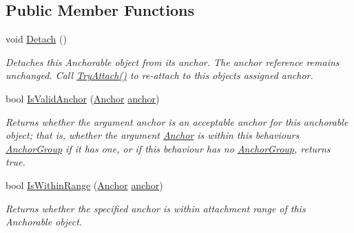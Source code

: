 \subsection*{Public Member Functions}
\begin{DoxyCompactItemize}
\item 
void \mbox{\hyperlink{class_leap_1_1_unity_1_1_interaction_1_1_anchorable_behaviour_afdba1fc31f7d6a20af66bdac91bf5d72}{Detach}} ()
\begin{DoxyCompactList}\small\item\em Detaches this Anchorable object from its anchor. The anchor reference remains unchanged. Call \mbox{\hyperlink{class_leap_1_1_unity_1_1_interaction_1_1_anchorable_behaviour_acf8928aca2c223daa30c8650564b9ab0}{Try\+Attach()}} to re-\/attach to this object\textquotesingle{}s assigned anchor. \end{DoxyCompactList}\item 
bool \mbox{\hyperlink{class_leap_1_1_unity_1_1_interaction_1_1_anchorable_behaviour_a8e014a55c2402653af66bff1ea6b2ba9}{Is\+Valid\+Anchor}} (\mbox{\hyperlink{class_leap_1_1_unity_1_1_interaction_1_1_anchor}{Anchor}} \mbox{\hyperlink{class_leap_1_1_unity_1_1_interaction_1_1_anchorable_behaviour_acc535c0d9a79d1ddcaab2dd0587ba9bb}{anchor}})
\begin{DoxyCompactList}\small\item\em Returns whether the argument anchor is an acceptable anchor for this anchorable object; that is, whether the argument \mbox{\hyperlink{class_leap_1_1_unity_1_1_interaction_1_1_anchor}{Anchor}} is within this behaviour\textquotesingle{}s \mbox{\hyperlink{class_leap_1_1_unity_1_1_interaction_1_1_anchor_group}{Anchor\+Group}} if it has one, or if this behaviour has no \mbox{\hyperlink{class_leap_1_1_unity_1_1_interaction_1_1_anchor_group}{Anchor\+Group}}, returns true. \end{DoxyCompactList}\item 
bool \mbox{\hyperlink{class_leap_1_1_unity_1_1_interaction_1_1_anchorable_behaviour_a93ce5813c3ce4805451e93d5c5050d4e}{Is\+Within\+Range}} (\mbox{\hyperlink{class_leap_1_1_unity_1_1_interaction_1_1_anchor}{Anchor}} \mbox{\hyperlink{class_leap_1_1_unity_1_1_interaction_1_1_anchorable_behaviour_acc535c0d9a79d1ddcaab2dd0587ba9bb}{anchor}})
\begin{DoxyCompactList}\small\item\em Returns whether the specified anchor is within attachment range of this Anchorable object. \end{DoxyCompactList}\item 

\end{DoxyCompactItemize}
